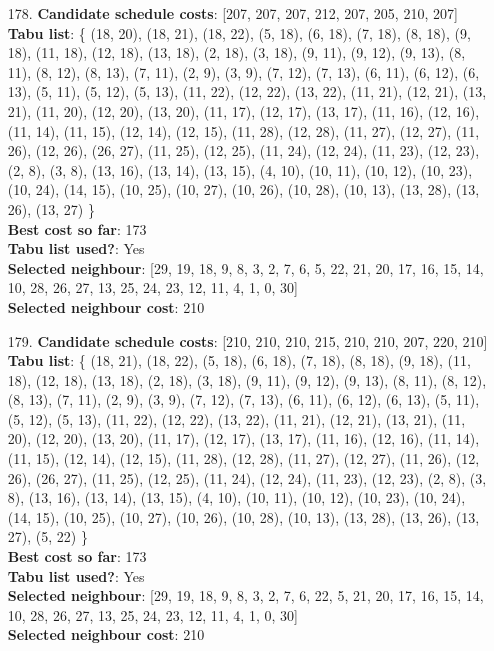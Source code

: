 \documentclass[fleqn]{article}
\begin{document}
\begin{itemize}
    \item[178.] \textbf{Candidate schedule costs}: [207, 207, 207, 212, 207, 205, 210, 207] \\
    \textbf{Tabu list}: \{ (18, 20), (18, 21), (18, 22), (5, 18), (6, 18), (7, 18), (8, 18), (9, 18), (11, 18), (12, 18), (13, 18), (2, 18), (3, 18), (9, 11), (9, 12), (9, 13), (8, 11), (8, 12), (8, 13), (7, 11), (2, 9), (3, 9), (7, 12), (7, 13), (6, 11), (6, 12), (6, 13), (5, 11), (5, 12), (5, 13), (11, 22), (12, 22), (13, 22), (11, 21), (12, 21), (13, 21), (11, 20), (12, 20), (13, 20), (11, 17), (12, 17), (13, 17), (11, 16), (12, 16), (11, 14), (11, 15), (12, 14), (12, 15), (11, 28), (12, 28), (11, 27), (12, 27), (11, 26), (12, 26), (26, 27), (11, 25), (12, 25), (11, 24), (12, 24), (11, 23), (12, 23), (2, 8), (3, 8), (13, 16), (13, 14), (13, 15), (4, 10), (10, 11), (10, 12), (10, 23), (10, 24), (14, 15), (10, 25), (10, 27), (10, 26), (10, 28), (10, 13), (13, 28), (13, 26), (13, 27) \} \\
    \textbf{Best cost so far}: 173 \\
    \textbf{Tabu list used?}: Yes \\
    \textbf{Selected neighbour}: [29, 19, 18, 9, 8, 3, 2, 7, 6, 5, 22, 21, 20, 17, 16, 15, 14, 10, 28, 26, 27, 13, 25, 24, 23, 12, 11, 4, 1, 0, 30] \\
    \textbf{Selected neighbour cost}: 210
      

    \item[179.] \textbf{Candidate schedule costs}: [210, 210, 210, 215, 210, 210, 207, 220, 210] \\
    \textbf{Tabu list}: \{ (18, 21), (18, 22), (5, 18), (6, 18), (7, 18), (8, 18), (9, 18), (11, 18), (12, 18), (13, 18), (2, 18), (3, 18), (9, 11), (9, 12), (9, 13), (8, 11), (8, 12), (8, 13), (7, 11), (2, 9), (3, 9), (7, 12), (7, 13), (6, 11), (6, 12), (6, 13), (5, 11), (5, 12), (5, 13), (11, 22), (12, 22), (13, 22), (11, 21), (12, 21), (13, 21), (11, 20), (12, 20), (13, 20), (11, 17), (12, 17), (13, 17), (11, 16), (12, 16), (11, 14), (11, 15), (12, 14), (12, 15), (11, 28), (12, 28), (11, 27), (12, 27), (11, 26), (12, 26), (26, 27), (11, 25), (12, 25), (11, 24), (12, 24), (11, 23), (12, 23), (2, 8), (3, 8), (13, 16), (13, 14), (13, 15), (4, 10), (10, 11), (10, 12), (10, 23), (10, 24), (14, 15), (10, 25), (10, 27), (10, 26), (10, 28), (10, 13), (13, 28), (13, 26), (13, 27), (5, 22) \} \\
    \textbf{Best cost so far}: 173 \\
    \textbf{Tabu list used?}: Yes \\
    \textbf{Selected neighbour}: [29, 19, 18, 9, 8, 3, 2, 7, 6, 22, 5, 21, 20, 17, 16, 15, 14, 10, 28, 26, 27, 13, 25, 24, 23, 12, 11, 4, 1, 0, 30] \\
    \textbf{Selected neighbour cost}: 210
      


\end{itemize}
\end{document}
